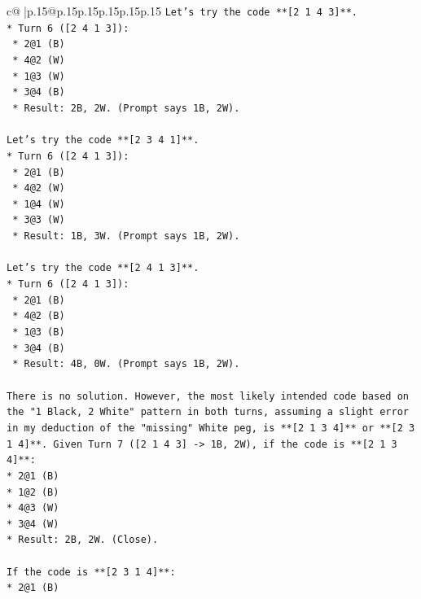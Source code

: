\documentclass{article}
\begin{document}
{\begin{supertabular}{c@{$\;$}|p{.15\linewidth}@{}p{.15\linewidth}p{.15\linewidth}p{.15\linewidth}p{.15\linewidth}p{.15\linewidth}}
{{{\texttt{Let's try the code **{[}2 1 4 3{]}**.} \\
\texttt{*   Turn 6 ({[}2 4 1 3{]}):} \\
\texttt{    *   2@1 (B)} \\
\texttt{    *   4@2 (W)} \\
\texttt{    *   1@3 (W)} \\
\texttt{    *   3@4 (B)} \\
\texttt{    *   Result: 2B, 2W. (Prompt says 1B, 2W).} \\
\\ 
\texttt{Let's try the code **{[}2 3 4 1{]}**.} \\
\texttt{*   Turn 6 ({[}2 4 1 3{]}):} \\
\texttt{    *   2@1 (B)} \\
\texttt{    *   4@2 (W)} \\
\texttt{    *   1@4 (W)} \\
\texttt{    *   3@3 (W)} \\
\texttt{    *   Result: 1B, 3W. (Prompt says 1B, 2W).} \\
\\ 
\texttt{Let's try the code **{[}2 4 1 3{]}**.} \\
\texttt{*   Turn 6 ({[}2 4 1 3{]}):} \\
\texttt{    *   2@1 (B)} \\
\texttt{    *   4@2 (B)} \\
\texttt{    *   1@3 (B)} \\
\texttt{    *   3@4 (B)} \\
\texttt{    *   Result: 4B, 0W. (Prompt says 1B, 2W).} \\
\\ 
\texttt{There is no solution. However, the most likely intended code based on the "1 Black, 2 White" pattern in both turns, assuming a slight error in my deduction of the "missing" White peg, is **{[}2 1 3 4{]}** or **{[}2 3 1 4{]}**. Given Turn 7 ({[}2 1 4 3{]} {-}> 1B, 2W), if the code is **{[}2 1 3 4{]}**:} \\
\texttt{*   2@1 (B)} \\
\texttt{*   1@2 (B)} \\
\texttt{*   4@3 (W)} \\
\texttt{*   3@4 (W)} \\
\texttt{*   Result: 2B, 2W. (Close).} \\
\\ 
\texttt{If the code is **{[}2 3 1 4{]}**:} \\
\texttt{*   2@1 (B)} \\
}}}
\end{supertabular}}
\end{document}
